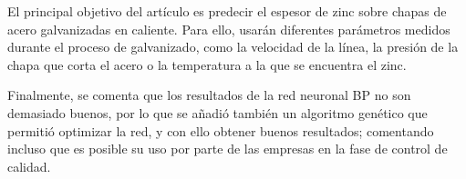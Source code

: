 El principal objetivo del artículo es predecir el espesor de zinc sobre chapas de acero galvanizadas en caliente. Para ello, usarán diferentes parámetros medidos durante el proceso de galvanizado, como la velocidad de la línea, la presión de la chapa que corta el acero o la temperatura a la que se encuentra el zinc.

Finalmente, se comenta que los resultados de la red neuronal BP no son demasiado buenos, por lo que se añadió también un algoritmo genético que permitió optimizar la red, y con ello obtener buenos resultados; comentando incluso que es posible su uso por parte de las empresas en la fase de control de calidad.

